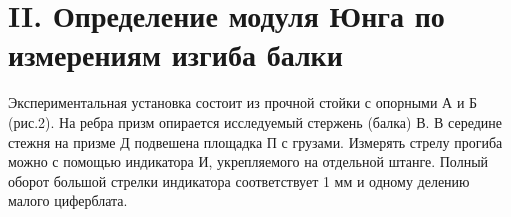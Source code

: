\documentclass[a4paper, 12pt]{article}%
\begin{document}
\section{II. Определение модуля Юнга по измерениям изгиба балки}

Экспериментальная установка состоит из прочной стойки с опорными А и Б (рис.2). На ребра призм опирается исследуемый стержень (балка) В. В середине стежня на призме Д подвешена площадка П с грузами. Измерять стрелу прогиба можно с помощью индикатора И, укрепляемого на отдельной штанге. Полный оборот большой стрелки индикатора соответствует 1 мм и одному делению малого циферблата.

\begin{figure}[h]
\end{figure}
\end{document}
